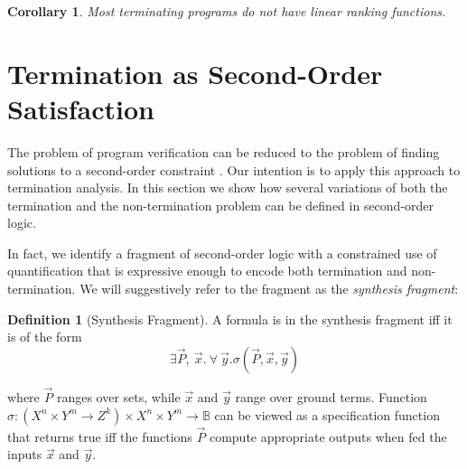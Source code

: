 \documentclass[preprint]{sigplanconf}
\newtheorem{corollary}[theorem]{Corollary}
\theoremstyle{definition}
\newtheorem{definition}[theorem]{Definition}
\begin{document}
\begin{corollary}
 Most terminating programs do not have linear ranking functions.
\end{corollary}
\fi


\section{Termination as Second-Order Satisfaction} \label{sec:second.order}



The problem of program verification can be reduced to the problem
of finding solutions to a second-order constraint \cite{DBLP:conf/pldi/GrebenshchikovLPR12,DBLP:conf/pldi/GulwaniSV08}. 
Our intention is to apply this approach to termination analysis. 
In this section we show how several variations of both the termination and the non-termination problem can be defined in second-order logic.  

In fact, we identify a fragment of second-order logic with a constrained use of quantification that is expressive enough to encode both termination and non-termination.
We will suggestively refer to the fragment as the \emph{synthesis fragment}:


\begin{definition}[Synthesis Fragment]
 A formula is in the synthesis fragment iff it is of the form
 \[
  \exists \vec{P},~ \vec{x} . ~\forall~ \vec{y} . \sigma(\vec{P}, \vec{x}, \vec{y})
 \]

where $\vec{P}$ ranges over sets, while $\vec{x}$ and $\vec{y}$ range over ground terms.
Function $\sigma: (X^n \times Y^m \to Z^k) \times X^n \times Y^m  \to \mathbb{B}$ can be viewed as a specification function
that  returns true iff the functions $\vec{P}$ compute appropriate outputs
when fed the inputs $\vec{x}$ and $\vec{y}$.  
\end{definition}
\end{document}
